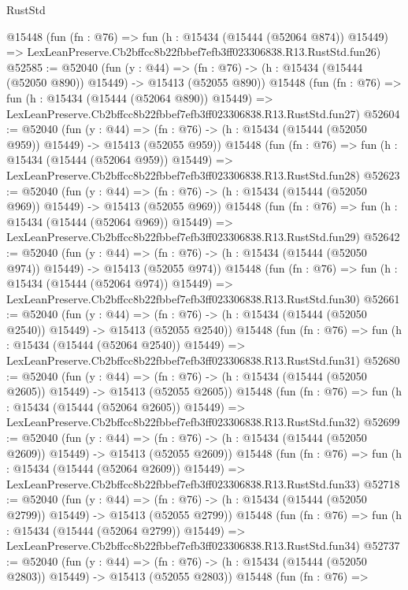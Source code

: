 \begin{lexlean}{RustStd}
\begin{coremodule}
    @15448
    (fun (fn : @76) =>
    fun (h : @15434 (@15444 (@52064 @874)) @15449) =>
    LexLeanPreserve.Cb2bffcc8b22fbbef7efb3ff023306838.R13.RustStd.fun26)
@52585 := @52040
    (fun (y : @44) =>
    (fn : @76) -> (h : @15434 (@15444 (@52050 @890)) @15449) -> @15413 (@52055 @890))
    @15448
    (fun (fn : @76) =>
    fun (h : @15434 (@15444 (@52064 @890)) @15449) =>
    LexLeanPreserve.Cb2bffcc8b22fbbef7efb3ff023306838.R13.RustStd.fun27)
@52604 := @52040
    (fun (y : @44) =>
    (fn : @76) -> (h : @15434 (@15444 (@52050 @959)) @15449) -> @15413 (@52055 @959))
    @15448
    (fun (fn : @76) =>
    fun (h : @15434 (@15444 (@52064 @959)) @15449) =>
    LexLeanPreserve.Cb2bffcc8b22fbbef7efb3ff023306838.R13.RustStd.fun28)
@52623 := @52040
    (fun (y : @44) =>
    (fn : @76) -> (h : @15434 (@15444 (@52050 @969)) @15449) -> @15413 (@52055 @969))
    @15448
    (fun (fn : @76) =>
    fun (h : @15434 (@15444 (@52064 @969)) @15449) =>
    LexLeanPreserve.Cb2bffcc8b22fbbef7efb3ff023306838.R13.RustStd.fun29)
@52642 := @52040
    (fun (y : @44) =>
    (fn : @76) -> (h : @15434 (@15444 (@52050 @974)) @15449) -> @15413 (@52055 @974))
    @15448
    (fun (fn : @76) =>
    fun (h : @15434 (@15444 (@52064 @974)) @15449) =>
    LexLeanPreserve.Cb2bffcc8b22fbbef7efb3ff023306838.R13.RustStd.fun30)
@52661 := @52040
    (fun (y : @44) =>
    (fn : @76) -> (h : @15434 (@15444 (@52050 @2540)) @15449) -> @15413 (@52055 @2540))
    @15448
    (fun (fn : @76) =>
    fun (h : @15434 (@15444 (@52064 @2540)) @15449) =>
    LexLeanPreserve.Cb2bffcc8b22fbbef7efb3ff023306838.R13.RustStd.fun31)
@52680 := @52040
    (fun (y : @44) =>
    (fn : @76) -> (h : @15434 (@15444 (@52050 @2605)) @15449) -> @15413 (@52055 @2605))
    @15448
    (fun (fn : @76) =>
    fun (h : @15434 (@15444 (@52064 @2605)) @15449) =>
    LexLeanPreserve.Cb2bffcc8b22fbbef7efb3ff023306838.R13.RustStd.fun32)
@52699 := @52040
    (fun (y : @44) =>
    (fn : @76) -> (h : @15434 (@15444 (@52050 @2609)) @15449) -> @15413 (@52055 @2609))
    @15448
    (fun (fn : @76) =>
    fun (h : @15434 (@15444 (@52064 @2609)) @15449) =>
    LexLeanPreserve.Cb2bffcc8b22fbbef7efb3ff023306838.R13.RustStd.fun33)
@52718 := @52040
    (fun (y : @44) =>
    (fn : @76) -> (h : @15434 (@15444 (@52050 @2799)) @15449) -> @15413 (@52055 @2799))
    @15448
    (fun (fn : @76) =>
    fun (h : @15434 (@15444 (@52064 @2799)) @15449) =>
    LexLeanPreserve.Cb2bffcc8b22fbbef7efb3ff023306838.R13.RustStd.fun34)
@52737 := @52040
    (fun (y : @44) =>
    (fn : @76) -> (h : @15434 (@15444 (@52050 @2803)) @15449) -> @15413 (@52055 @2803))
    @15448
    (fun (fn : @76) =>

\end{coremodule}
\end{lexlean}
